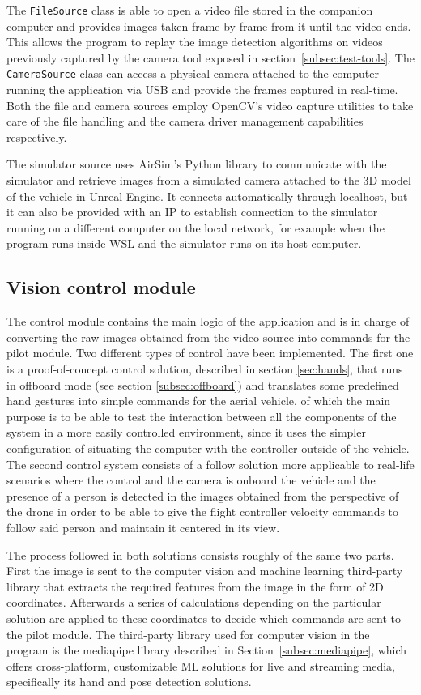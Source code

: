 The \texttt{FileSource} class is able to open a video file stored in the companion computer and provides images taken frame by frame from it until the video ends.
This allows the program to replay the image detection algorithms on videos previously captured by the camera tool exposed in section~\ref{subsec:test-tools}.
The \texttt{CameraSource} class can access a physical camera attached to the computer running the application via USB and provide the frames captured in real-time.
Both the file and camera sources employ OpenCV's video capture utilities to take care of the file handling and the camera driver management capabilities respectively.

The simulator source uses AirSim's Python library to communicate with the simulator and retrieve images from a simulated camera attached to the 3D model of the vehicle in Unreal Engine.
It connects automatically through localhost, but it can also be provided with an IP to establish connection to the simulator running on a different computer on the local network, for example when the program runs inside WSL and the simulator runs on its host computer.

\subsection{Vision control module}
\label{subsec:control-module}
The control module contains the main logic of the application and is in charge of converting the raw images obtained from the video source into commands for the pilot module.
Two different types of control have been implemented.
The first one is a proof-of-concept control solution, described in section \ref{sec:hands}, that runs in offboard mode (see section \ref{subsec:offboard}) and translates some predefined hand gestures into simple commands for the aerial vehicle, of which the main purpose is to be able to test the interaction between all the components of the system in a more easily controlled environment, since it uses the simpler configuration of situating the computer with the controller outside of the vehicle.
The second control system consists of a follow solution more applicable to real-life scenarios where the control and the camera is onboard the vehicle and the presence of a person is detected in the images obtained from the perspective of the drone in order to be able to give the flight controller velocity commands to follow said person and maintain it centered in its view.

The process followed in both solutions consists roughly of the same two parts.
First the image is sent to the computer vision and machine learning third-party library that extracts the required features from the image in the form of 2D coordinates.
Afterwards a series of calculations depending on the particular solution are applied to these coordinates to decide which commands are sent to the pilot module.
The third-party library used for computer vision in the program is the mediapipe library described in Section~\ref{subsec:mediapipe}, which offers cross-platform, customizable ML solutions for live and streaming media, specifically its hand and pose detection solutions.

